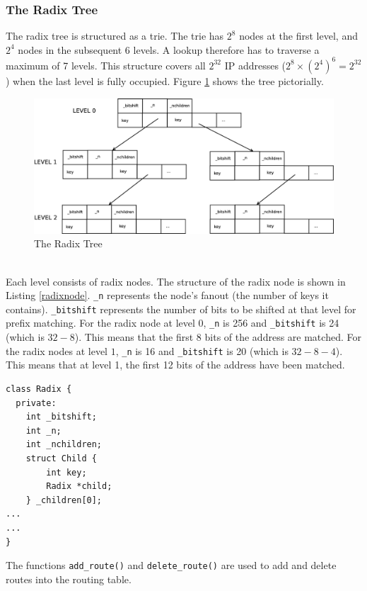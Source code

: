 \documentclass[a4paper]{article}
\begin{document}
\subsubsection{The Radix Tree}
The radix tree is structured as a trie. The trie has  $2^8$ nodes at the first level, and $2^4$ nodes in the subsequent 6 levels. A lookup therefore has to traverse a maximum of 7 levels. This structure covers all $2^{32}$ IP addresses ($2^8\times(2^4)^6=2^{32}$) when the last level is fully occupied. Figure \ref{radixtree} shows the tree pictorially.\\
\begin{figure}[tph]
\begin{center}
\includegraphics[scale = 0.23]{../images/diagrams/radixtree2.eps}
\caption{The Radix Tree}
\label{radixtree}
\end{center}
\end{figure}
\\Each level consists of radix nodes. The structure of the radix node is shown in Listing \ref{radixnode}. \verb+_n+ represents the node's fanout (the number of keys it contains). \verb+_bitshift+ represents the number of bits to be shifted at that level for prefix matching. For the radix node at level 0, \verb+_n+ is 256 and \verb+_bitshift+ is 24 (which is $32 - 8$). This means that the first 8 bits of the address are matched. For the radix nodes at level $1$, \verb+_n+ is 16 and \verb+_bitshift+ is 20 (which is $32 -8 -4$). This means that at level 1, the first 12 bits of the address have been matched.
\begin{lstlisting}[float=tph, caption = The Radix Class, label=radixnode]
class Radix {
  private:
    int _bitshift;
    int _n;
    int _nchildren;
    struct Child {
        int key;
        Radix *child;
    } _children[0];
...
...
}
\end{lstlisting}
The functions \verb+add_route()+ and \verb+delete_route()+ are used to add and delete routes into the routing table.
\end{document}
